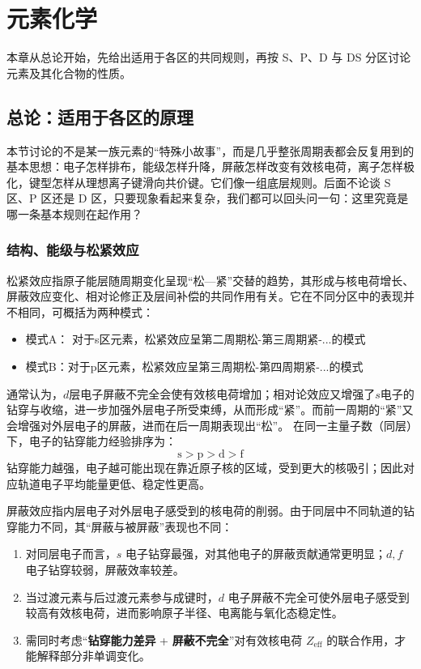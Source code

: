 \documentclass[UTF8]{ctexbook}
\begin{document}
\chapter{元素化学}

本章从总论开始，先给出适用于各区的共同规则，再按 S、P、D 与 DS 分区讨论元素及其化合物的性质。

\section{总论：适用于各区的原理}

本节讨论的不是某一族元素的“特殊小故事”，而是几乎整张周期表都会反复用到的基本思想：电子怎样排布，能级怎样升降，屏蔽怎样改变有效核电荷，离子怎样极化，键型怎样从理想离子键滑向共价键。它们像一组底层规则。后面不论谈 S 区、P 区还是 D 区，只要现象看起来复杂，我们都可以回头问一句：这里究竟是哪一条基本规则在起作用？

\subsection{结构、能级与松紧效应}

松紧效应指原子能层随周期变化呈现“松—紧”交替的趋势，其形成与核电荷增长、屏蔽效应变化、相对论修正及层间补偿的共同作用有关。它在不同分区中的表现并不相同，可概括为两种模式：
\begin{itemize}
  \item 模式A： 对于s区元素，松紧效应呈第二周期松-第三周期紧-...的模式
  \item 模式B：对于p区元素，松紧效应呈第三周期松-第四周期紧-...的模式
\end{itemize}

通常认为，$d$层电子屏蔽不完全会使有效核电荷增加；相对论效应又增强了$s$电子的钻穿与收缩，进一步加强外层电子所受束缚，从而形成“紧”。而前一周期的“紧”又会增强对外层电子的屏蔽，进而在后一周期表现出“松”。
在同一主量子数（同层）下，电子的钻穿能力经验排序为：
\[
\mathrm{s > p > d > f}
\]
钻穿能力越强，电子越可能出现在靠近原子核的区域，受到更大的核吸引；因此对应轨道电子平均能量更低、稳定性更高。

屏蔽效应指内层电子对外层电子感受到的核电荷的削弱。由于同层中不同轨道的钻穿能力不同，其“屏蔽与被屏蔽”表现也不同：
\begin{enumerate}
  \item 对同层电子而言，$s$ 电子钻穿最强，对其他电子的屏蔽贡献通常更明显；$d,f$ 电子钻穿较弱，屏蔽效率较差。
  \item 当过渡元素与后过渡元素参与成键时，$d$ 电子屏蔽不完全可使外层电子感受到较高有效核电荷，进而影响原子半径、电离能与氧化态稳定性。
  \item 需同时考虑“\textbf{钻穿能力差异} + \textbf{屏蔽不完全}”对有效核电荷 $Z_{\mathrm{eff}}$ 的联合作用，才能解释部分非单调变化。
\end{enumerate}
\end{document}
